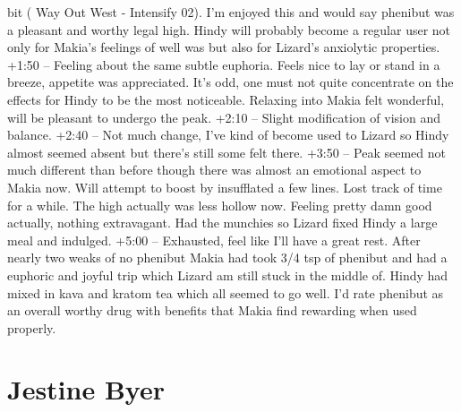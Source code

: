 \documentclass[12pt]{book}
\begin{document}
bit ( Way Out West - Intensify 02). I'm enjoyed this and would say phenibut was a pleasant and worthy legal high. Hindy will probably become a regular user not only for Makia's feelings of well was but also for Lizard's anxiolytic properties. +1:50 -- Feeling about the same subtle euphoria. Feels nice to lay or stand in a breeze, appetite was appreciated. It's odd, one must not quite concentrate on the effects for Hindy to be the most noticeable. Relaxing into Makia felt wonderful, will be pleasant to undergo the peak. +2:10 -- Slight modification of vision and balance. +2:40 -- Not much change, I've kind of become used to Lizard so Hindy almost seemed absent but there's still some felt there. +3:50 -- Peak seemed not much different than before though there was almost an emotional aspect to Makia now. Will attempt to boost by insufflated a few lines. Lost track of time for a while. The high actually was less hollow now. Feeling pretty damn good actually, nothing extravagant. Had the munchies so Lizard fixed Hindy a large meal and indulged. +5:00 -- Exhausted, feel like I'll have a great rest. After nearly two weaks of no phenibut Makia had took 3/4 tsp of phenibut and had a euphoric and joyful trip which Lizard am still stuck in the middle of. Hindy had mixed in kava and kratom tea which all seemed to go well. I'd rate phenibut as an overall worthy drug with benefits that Makia find rewarding when used properly.



\chapter{Jestine Byer}
\end{document}
